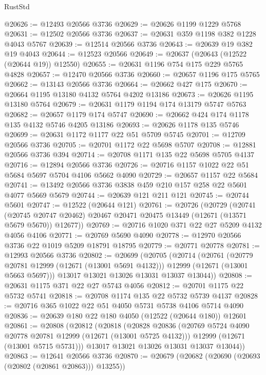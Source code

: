 \begin{lexlean}{RustStd}
\begin{coremodule}
@20626 := @12493 @20566 @3736
@20629 := @20626 @1199 @1229 @5768
@20631 := @12502 @20566 @3736
@20637 := @20631 @359 @1198 @382 @1228 @4043 @5767
@20639 := @12514 @20566 @3736
@20643 := @20639 @19 @382 @19 @4043
@20644 := @12523 @20566
@20649 := @20637 (@20643 (@12522 (@20644 @19)) @12550)
@20655 := @20631 @1196 @754 @175 @229 @5765 @4828
@20657 := @12470 @20566 @3736
@20660 := @20657 @1196 @175 @5765
@20662 := @13143 @20566 @3736
@20664 := @20662 @427 @175
@20670 := @20664 @1195 @13180 @4132 @5764 @4202 @13186
@20673 := @20626 @1195 @13180 @5764
@20679 := @20631 @1179 @1194 @174 @13179 @5747 @5763
@20682 := @20657 @1179 @174 @5747
@20690 := @20662 @424 @174 @1178 @135 @4132 @5746 @4205 @13186
@20693 := @20626 @1178 @135 @5746
@20699 := @20631 @1172 @1177 @22 @51 @5709 @5745
@20701 := @12709 @20566 @3736
@20705 := @20701 @1172 @22 @5698 @5707
@20708 := @12881 @20566 @3736 @394
@20714 := @20708 @1171 @135 @22 @5698 @5705 @4137
@20716 := @12894 @20566 @3736
@20726 := @20716 @1157 @1022 @22 @51 @5684 @5697 @5704 @4106 @5662 @4090
@20729 := @20657 @1157 @22 @5684
@20741 := @13492 @20566 @3736 @3838 @459 @210 @157 @258 @22 @5601 @4077 @5669 @5679
@20744 := @20639 @121 @211 @121
@20745 := @20744 @5601
@20747 := @12522 (@20644 @121)
@20761 := @20726
    (@20729
      (@20741
        (@20745 @20747 @20462)
        @20467
        @20471
        @20475
        @13449
        (@12671 (@13571 @5679 @5670))
        @12677))
@20769 := @20716 @1020 @371 @22 @27 @5209 @4132 @4056 @4106
@20771 := @20769 @5690 @4090
@20778 := @12970 @20566 @3736 @22 @1019 @5209 @18791 @18795
@20779 := @20771 @20778
@20781 := @12993 @20566 @3736
@20802 := @20699
    (@20705
      (@20714
        (@20761
          (@20779 @20781 @12999 (@12671 (@13001 @5691 @4132)))
          @12999
          (@12671 (@13001 @5663 @5697)))
        @13017
        @13021
        @13026
        @13031
        @13037
        @13044))
@20808 := @20631 @1175 @371 @22 @27 @5743 @4056
@20812 := @20701 @1175 @22 @5732 @5741
@20818 := @20708 @1174 @135 @22 @5732 @5739 @4137
@20828 := @20716 @365 @1022 @22 @51 @4050 @5731 @5738 @4106 @5714 @4090
@20836 := @20639 @180 @22 @180 @4050 (@12522 (@20644 @180)) @12601
@20861 := @20808
    (@20812
      (@20818
        (@20828
          @20836
          (@20769 @5724 @4090 @20778 @20781 @12999 (@12671 (@13001 @5725 @4132)))
          @12999
          (@12671 (@13001 @5715 @5731)))
        @13017
        @13021
        @13026
        @13031
        @13037
        @13044))
@20863 := @12641 @20566 @3736
@20870 := @20679 (@20682 (@20690 (@20693 (@20802 (@20861 @20863))) @13255))

\end{coremodule}
\end{lexlean}
